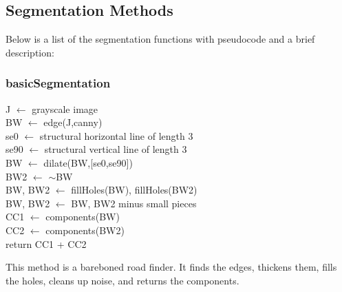 \documentclass[12pt]{article}
\begin{document}
\subsection*{Segmentation Methods}

Below is a list of the segmentation functions with pseudocode and a brief description:


\subsubsection*{basicSegmentation}
\begin{addmargin}[12em]{1em}
	J $\leftarrow$ grayscale image \\
	BW $\leftarrow$ edge(J,canny) \\
	se0 $\leftarrow$ structural horizontal line of length 3 \\
	se90 $\leftarrow$ structural vertical line of length 3 \\
	BW $\leftarrow$ dilate(BW,[se0,se90]) \\
	BW2 $\leftarrow$ $\sim$BW \\
	BW, BW2 $\leftarrow$ fillHoles(BW), fillHoles(BW2)\\
	BW, BW2 $\leftarrow$ BW, BW2 minus small pieces \\
	CC1 $\leftarrow$ components(BW) \\
	CC2 $\leftarrow$ components(BW2) \\
	return CC1 + CC2 \\	
\end{addmargin}
This method is a bareboned road finder. It finds the edges, thickens them, fills the holes, cleans up noise, and returns the components.
\end{document}
